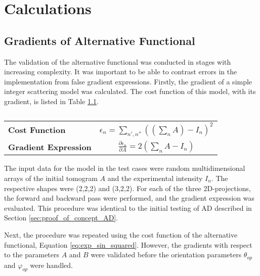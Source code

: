 
\chapter{Calculations}

\section{Gradients of Alternative Functional} %

The validation of the alternative functional was conducted in stages with increasing complexity.
It was important to be able to contrast errors in the implementation from false gradient expressions.
Firstly, the gradient of a simple integer scattering model was calculated. The cost function of this model, with its gradient, is listed in Table \ref{tab:integer_model}.

\begin{table}[h]
    \centering
    \caption{}
    \label{tab:integer_model}
    \begin{tabular}{ l c }
        \hline
        \textbf{Cost Function}       & $\epsilon_{n} = \sum_{n', n''} ( (\sum_{n} A) - I_{n})^2 $           \\
        \textbf{Gradient Expression} & $\frac{\partial \epsilon_{n}}{\partial A} = 2 (\sum_{n} A - I_{n}) $ \\
        \hline
    \end{tabular}
\end{table}

The input data for the model in the test cases were random multidimensional arrays of the initial tomogram $A$ and the experimental intensity $I_{n}$.
The respective shapes were (2,2,2) and (3,2,2).
For each of the three 2D-projections, the forward and backward pass were performed, and the gradient expression was evaluated. %
This procedure was identical to the initial testing of AD described in Section \ref{sec:proof_of_concept_AD}.

Next, the procedure was repeated using the cost function of the alternative functional, Equation \eqref{eq:exp_sin_squared}.
However, the gradients with respect to the parameters $A$ and $B$ were validated before the orientation parameters $\theta_{op}$ and $\varphi_{op}$ were handled.


